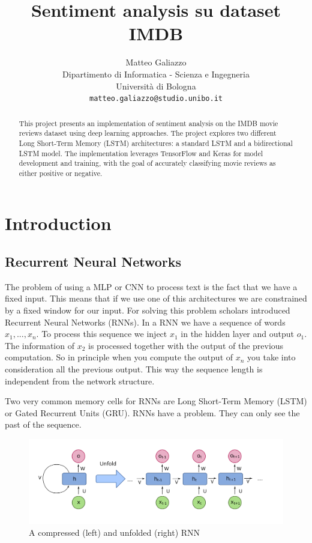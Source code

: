 \documentclass{article}
\title{Sentiment analysis su dataset IMDB}
\author{
 Matteo Galiazzo \\
  Dipartimento di Informatica - Scienza e Ingegneria\\
  Università di Bologna\\
  \texttt{matteo.galiazzo@studio.unibo.it} \\
}
\begin{document}
\maketitle
\begin{abstract}
This project presents an implementation of sentiment analysis on the IMDB movie reviews dataset using deep learning approaches.
The project explores two different Long Short-Term Memory (LSTM) architectures: a standard LSTM and a bidirectional LSTM model.
The implementation leverages TensorFlow and Keras for model development and training, with the goal of accurately classifying movie reviews as either positive or negative.
\end{abstract}



\section{Introduction}


\subsection{Recurrent Neural Networks}

The problem of using a MLP or CNN to process text is the fact that we have a fixed input.
This means that if we use one of this architectures we are constrained by a fixed window for our input.
For solving this problem scholars introduced Recurrent Neural Networks (RNNs).
In a RNN we have a sequence of words $x_1, ..., x_n$.
To process this sequence we inject $x_1$ in the hidden layer and output $o_1$.
The information of $x_2$ is processed together with the output of the previous computation.
So in principle when you compute the output of $x_n$ you take into consideration all the previous output.
This way the sequence length is independent from the network structure.

Two very common memory cells for RNNs are Long Short-Term Memory (LSTM) or Gated Recurrent Units (GRU).
RNNs have a problem. They can only see the past of the sequence.

\begin{figure}[htbp]
  \centering
  \includegraphics[width=0.8\linewidth]{img/rnn_unfolded.png}
  \caption{A compressed (left) and unfolded (right) RNN}
  \label{fig:rnn_unfolded}
\end{figure}
\end{document}
